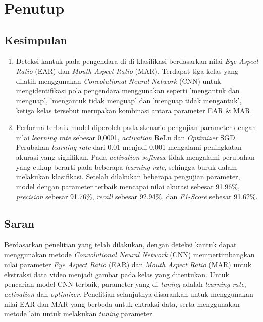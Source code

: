\chapter{Penutup}

\section{Kesimpulan}

    \begin{enumerate}
        \item Deteksi kantuk pada pengendara di di klasifikasi berdasarkan nilai
         \textit{Eye Aspect Ratio} (EAR) dan \textit{Mouth Aspect Ratio} (MAR).
        Terdapat tiga kelas yang dilatih menggunakan \textit{Convolutional Neural Network}
         (CNN) untuk mengidentifikasi pola pengendara menggunakan seperti 
         ’mengantuk dan menguap’, ’mengantuk tidak menguap’ dan ’menguap tidak mengantuk’, 
         ketiga kelas tersebut merupakan kombinasi antara parameter EAR \& MAR.
        
        \item Performa terbaik model diperoleh pada skenario pengujian parameter dengan 
        nilai \textit{learning rate} sebesar 0,0001, \textit{activation} ReLu dan \textit{Optimizer} SGD.
         Perubahan \textit{learning rate} dari 0.01 menjadi 0.001 mengalami peningkatan akurasi yang signifikan.
          Pada \textit{activation softmax} tidak mengalami perubahan yang cukup berarti pada beberapa
           \textit{learning rate}, sehingga buruk dalam melakukan klasifikasi. 
           Setelah dilakukan beberapa pengujian parameter, model dengan parameter terbaik mencapai nilai 
           akurasi sebesar 91.96\%, \textit{precision} sebesar 91.76\%, \textit{recall} sebesar 92.94\%, dan \textit{F1-Score} sebesar 91.62\%.
    \end{enumerate}


\section{Saran}

Berdasarkan penelitian yang telah dilakukan, dengan deteksi kantuk dapat menggunakan metode \textit{Convolutional Neural Network} (CNN) mempertimbangkan nilai parameter \textit{Eye Aspect Ratio} (EAR) dan \textit{Mouth Aspect Ratio} (MAR) untuk ekstraksi data video menjadi gambar pada kelas yang ditentukan. Untuk pencarian model CNN terbaik, parameter yang di \textit{tuning} adalah \textit{learning rate}, \textit{activation} dan \textit{optimizer}. Penelitian selanjutnya disarankan untuk menggunakan nilai EAR dan MAR yang berbeda untuk ektraksi data, serta menggunakan metode lain untuk melakukan \textit{tuning} parameter.








